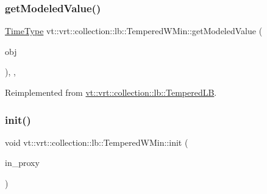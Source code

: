 \mbox{\label{structvt_1_1vrt_1_1collection_1_1lb_1_1_tempered_w_min_a80d9e3a0dd25bbe3183bd3d3f54c6af2}} 
\subsubsection{\texorpdfstring{get\+Modeled\+Value()}{getModeledValue()}}
{\footnotesize\ttfamily \hyperlink{namespacevt_a876a9d0cd5a952859c72de8a46881442}{Time\+Type} vt\+::vrt\+::collection\+::lb\+::\+Tempered\+W\+Min\+::get\+Modeled\+Value (\begin{DoxyParamCaption}\item[{const \hyperlink{structvt_1_1elm_1_1_element_i_d_struct}{elm\+::\+Element\+I\+D\+Struct} \&}]{obj }\end{DoxyParamCaption})\hspace{0.3cm}{\ttfamily [override]}, {\ttfamily [protected]}, {\ttfamily [virtual]}}



Reimplemented from \hyperlink{structvt_1_1vrt_1_1collection_1_1lb_1_1_tempered_l_b_af0068125a6548e98f45142a736a0742c}{vt\+::vrt\+::collection\+::lb\+::\+Tempered\+LB}.

\mbox{\label{structvt_1_1vrt_1_1collection_1_1lb_1_1_tempered_w_min_a4568be2f1baa683968308e48a0743dea}} 
\subsubsection{\texorpdfstring{init()}{init()}}
{\footnotesize\ttfamily void vt\+::vrt\+::collection\+::lb\+::\+Tempered\+W\+Min\+::init (\begin{DoxyParamCaption}\item[{\hyperlink{structvt_1_1objgroup_1_1proxy_1_1_proxy}{objgroup\+::proxy\+::\+Proxy}$<$ \hyperlink{structvt_1_1vrt_1_1collection_1_1lb_1_1_tempered_w_min}{Tempered\+W\+Min} $>$}]{in\+\_\+proxy }\end{DoxyParamCaption})}

